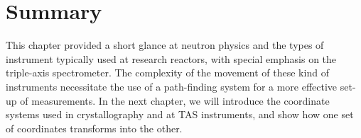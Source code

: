 \section{Summary}

This chapter provided a short glance at neutron physics and the types of instrument typically used at research
reactors, with special emphasis on the triple-axis spectrometer. The complexity of the movement of these kind of
instruments necessitate the use of a path-finding system for a more effective set-up of measurements.
In the next chapter, we will introduce the coordinate systems used in crystallography and at TAS instruments,
and show how one set of coordinates transforms into the other.
